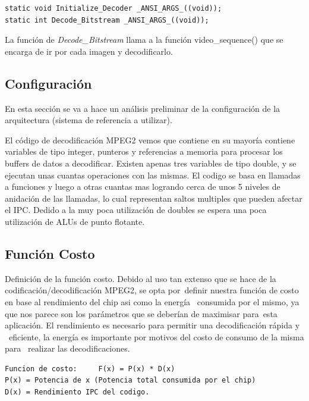 \documentclass[journal]{IEEEtran}
\begin{document}
\footnotesize \begin{verbatim}
static void Initialize_Decoder _ANSI_ARGS_((void));
static int Decode_Bitstream _ANSI_ARGS_((void));
\end{verbatim}
\normalsize

La funci\'{o}n de \textit{Decode\_Bitstream} llama a la funci\'{o}n video\_sequence() que se encarga de ir por cada imagen y decodificarlo. \newline

\subsection{Configuraci\'{o}n}
En esta secci\'{o}n se va a hace un an\'{a}lisis preliminar de la configuraci\'{o}n de la arquitectura (sistema de referencia a utilizar).

El c\'odigo de decodificaci\'on MPEG2 vemos que contiene en su mayor\'ia contiene variables de tipo integer, punteros y referencias a memoria para procesar los buffers de datos a decodificar. Existen apenas tres variables de tipo double, y se ejecutan unas cuantas operaciones con las mismas.  El codigo se basa en llamadas a funciones y luego a otras cuantas mas logrando cerca de unos 5 niveles de anidaci\'on de las llamadas, lo cual representan saltos multiples que pueden afectar el IPC.
Dedido a la muy poca utilizaci\'on de doubles se espera una poca utilizaci\'on de ALUs de punto flotante. \newline

\subsection{Funci\'{o}n Costo}
Definici\'{o}n de la funci\'{o}n costo.
Debido al uso tan extenso que se hace de la codificaci\'{o}n/decodificaci\'{o}n MPEG2, se opta por\
definir nuestra funci\'{o}n de costo en base al rendimiento del chip asi como la energ\'{i}a \
consumida por el mismo, ya que nos parece son los par\'{a}metros que se deber\'{i}an de maximisar para\
esta aplicaci\'{o}n.  El rendimiento es necesario para permitir una decodificaci\'{o}n r\'{a}pida y \
eficiente, la energ\'{i}a es importante por motivos del costo de consumo de la misma para \
realizar las decodificaciones.

\footnotesize \begin{verbatim}
Funcion de costo:     F(x) = P(x) * D(x)
P(x) = Potencia de x (Potencia total consumida por el chip)
D(x) = Rendimiento IPC del codigo.
\end{verbatim}
\normalsize
\end{document}
